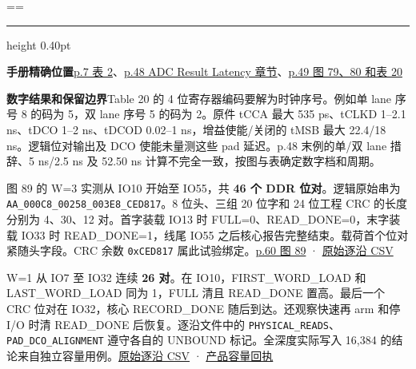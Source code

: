 \documentclass[UTF8,fontset=none,zihao=-4,a4paper]{ctexart}
\newcommand{\TraceSubsection}[1]{%
  \par\addvspace{7pt}\noindent{\large\bfseries\color{TraceTitle}#1\par}\nopagebreak[4]}
\newcommand{\TraceKeepHeading}{\par\penalty-120\relax}
\newcommand{\TraceItem}[1]{%
  \par{\color{TraceRule}\hrule height 0.40pt}\nobreak\smallskip%
  \noindent{\bfseries\color{TraceTitle}#1\par}\nopagebreak[4]}
\newcommand{\TraceField}[2]{%
  \par\noindent\textbf{\textcolor{TraceAccent}{#1}}\enspace#2\par}
\newenvironment{TraceCard}
  {\par\addvspace{4pt}\setbox\TraceCardBox=\vbox\bgroup\hsize=\linewidth}
  {\par\egroup
   \ifdim\dimexpr\ht\TraceCardBox+\dp\TraceCardBox\relax<0.30\textheight
     \box\TraceCardBox
   \else
     \unvbox\TraceCardBox
   \fi}
\newcommand{\TraceCode}[1]{\texttt{\mdseries\upshape #1}}
\begin{document}
\begin{TraceCard}
\TraceItem{连续读出时间}
\TraceField{手册精确位置}{\href{https://www.analog.com/media/en/technical-documentation/data-sheets/ad4080.pdf\#page=7}{p.7 表 2}、\allowbreak{}\href{https://www.analog.com/media/en/technical-documentation/data-sheets/ad4080.pdf\#page=48}{p.48 ADC Result Latency 章节}、\allowbreak{}\href{https://www.analog.com/media/en/technical-documentation/data-sheets/ad4080.pdf\#page=49}{p.49 图 79、\allowbreak{}80 和表 20}}
\TraceField{数字结果和保留边界}{Table 20 的 4 位寄存器编码要解为时钟序号。例如单 lane 序号 8 的码为 5，双 lane 序号 5 的码为 2。原件 tCCA 最大 535 ps、\allowbreak{}tCLKD 1–2.1 ns、\allowbreak{}tDCO 1–2 ns、\allowbreak{}tDCOD 0.02–1 ns，增益使能/关闭的 tMSB 最大 22.4/18 ns。逻辑位对输出及 DCO 使能未量测这些 pad 延迟。p.48 末例的单/双 lane 措辞、\allowbreak{}5 ns/2.5 ns 及 52.50 ns 计算不完全一致，按图与表确定数字档和周期。}
\end{TraceCard}


\TraceKeepHeading{}\hypertarget{trace-anchor-10}{}\TraceSubsection{产品 FIFO 的实际抓取值}

图 89 的 W=3 实测从 IO10 开始至 IO55，共 \textbf{46 个 DDR 位对}。逻辑原始串为 \TraceCode{AA\_\relax{}000C8\_\penalty150\relax{}00258\_\penalty150\relax{}003E8\_\penalty150\relax{}CED817}。8 位头、\allowbreak{}三组 20 位字和 24 位工程 CRC 的长度分别为 4、\allowbreak{}30、\allowbreak{}12 对。首字装载 IO13 时 FULL=0、\allowbreak{}READ\_\relax{}DONE=\relax{}0，末字装载 IO33 时 READ\_\relax{}DONE=\relax{}1，线尾 IO55 之后核心报告完整结束。载荷首个位对紧随头字段。CRC 余数 \TraceCode{0xCED817} 属此试验绑定。\href{https://www.analog.com/media/en/technical-documentation/data-sheets/ad4080.pdf\#page=60}{p.60 图 89} · \href{https://github.com/defineiocc02/20bit\_SAR\_ADC\_Behaviour\_Verification/blob/feat/ad4080-peripherals/rtl/ad4080\_periph/integration/product/evidence/pin\_edges.csv}{原始逐沿 CSV}\par

W=1 从 IO7 至 IO32 连续 \textbf{26 对}。在 IO10，FIRST\_\relax{}WORD\_\relax{}LOAD 和 LAST\_\relax{}WORD\_\relax{}LOAD 同为 1，FULL 清且 READ\_\relax{}DONE 置高。最后一个 CRC 位对在 IO32，核心 RECORD\_\relax{}DONE 随后到达。还观察快速再 arm 和停 I/O 时清 READ\_\relax{}DONE 后恢复。逐沿文件中的 \TraceCode{PHYSICAL\_\penalty150\relax{}READS}、\allowbreak{}\TraceCode{PAD\_\relax{}DCO\_\penalty150\relax{}ALIGNMENT} 遵守各自的 UNBOUND 标记。全深度实际写入 16,384 的结论来自独立容量用例。\href{https://github.com/defineiocc02/20bit\_SAR\_ADC\_Behaviour\_Verification/blob/feat/ad4080-peripherals/rtl/ad4080\_periph/integration/product/evidence/pin\_edges.csv}{原始逐沿 CSV} · \href{https://github.com/defineiocc02/20bit\_SAR\_ADC\_Behaviour\_Verification/blob/feat/ad4080-peripherals/rtl/ad4080\_periph/integration/product/evidence/verification.txt}{产品容量回执}\par
\end{document}

